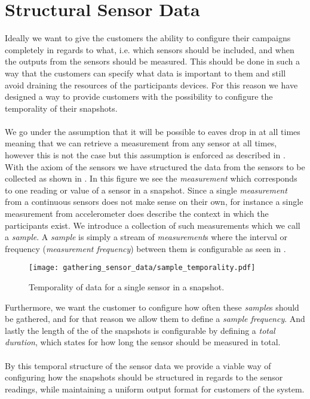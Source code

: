 \section{Structural Sensor Data}
\label{sec:structural_sensor_data}

Ideally we want to give the customers the ability to configure their campaigns completely in regards to what, i.e. which sensors should be included, and when the outputs from the sensors should be measured. This should be done in such a way that the customers can specify what data is important to them and still avoid draining the resources of the participants devices. For this reason we have designed a way to provide customers with the possibility to configure the temporality of their snapshots. 
\\\\
We go under the assumption that it will be possible to eaves drop in at all times meaning that we can retrieve a measurement from any sensor at all times, however this is not the case but this assumption is enforced as described in . With the axiom of the sensors we have structured the data from the sensors to be collected as shown in . In this figure we see the \emph{measurement} which corresponds to one reading or value of a sensor in a snapshot. Since a single \emph{measurement} from a continuous sensors does not make sense on their own, for instance a single measurement from accelerometer does describe the context in which the participants exist. We introduce a collection of such measurements which we call a \emph{sample}. A \emph{sample} is simply a stream of \emph{measurement}s where the interval or frequency (\emph{measurement frequency}) between them is configurable as seen in .

\begin{figure}[!htbp]
    \centering
    \texttt{[image: gathering\_sensor\_data/sample\_temporality.pdf]}
    \caption{Temporality of data for a single sensor in a snapshot.}
    \label{fig:sample_temporality}
\end{figure}
\FloatBarrier

Furthermore, we want the customer to configure how often these \emph{sample}s should be gathered, and for that reason we allow them to define a \emph{sample frequency}. And lastly the length of the of the snapshots is configurable by defining a \emph{total duration}, which states for how long the sensor should be measured in total.
\\\\
By this temporal structure of the sensor data we provide a viable way of configuring how the snapshots should be structured in regards to the sensor readings, while maintaining a uniform output format for customers of the system.

